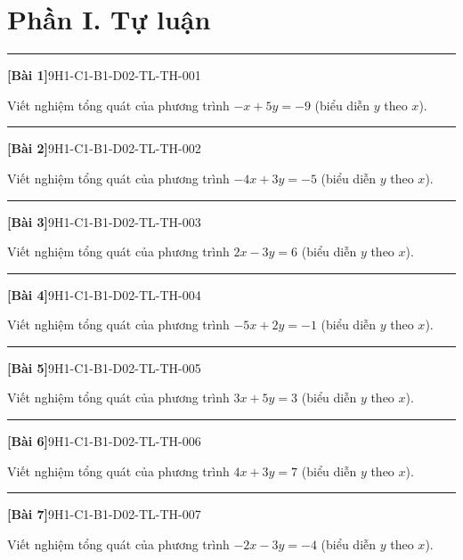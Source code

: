 \documentclass[12pt,a4paper]{article}
\newif\ifloigiai
\newenvironment{cauhoi}[2]{%
  \par\medskip\noindent\rule{\textwidth}{0.4pt}\par\nopagebreak
  \noindent\textbf{[#1]}\hfill{\scriptsize\ttfamily #2}\par\nopagebreak\smallskip}{\par}
\newcommand{\loigiai}[1]{\ifloigiai\par\smallskip\noindent\textit{Lời giải.} #1\par\fi}
\begin{document}
\section*{Phần I. Tự luận}
\begin{cauhoi}{Bài 1}{9H1-C1-B1-D02-TL-TH-001}
Viết nghiệm tổng quát của phương trình $-x+5y=-9$ (biểu diễn $y$ theo $x$).
\loigiai{Ta có $5y=-9+x$ nên $y=\dfrac{1}{5}x-\dfrac{9}{5}$. Nghiệm tổng quát là $(x;\,\dfrac{1}{5}x-\dfrac{9}{5})$ với $x\in\mathbb R$.}
\end{cauhoi}
\begin{cauhoi}{Bài 2}{9H1-C1-B1-D02-TL-TH-002}
Viết nghiệm tổng quát của phương trình $-4x+3y=-5$ (biểu diễn $y$ theo $x$).
\loigiai{Ta có $3y=-5+4x$ nên $y=\dfrac{4}{3}x-\dfrac{5}{3}$. Nghiệm tổng quát là $(x;\,\dfrac{4}{3}x-\dfrac{5}{3})$ với $x\in\mathbb R$.}
\end{cauhoi}
\begin{cauhoi}{Bài 3}{9H1-C1-B1-D02-TL-TH-003}
Viết nghiệm tổng quát của phương trình $2x-3y=6$ (biểu diễn $y$ theo $x$).
\loigiai{Ta có $-3y=6-2x$ nên $y=\dfrac{2}{3}x-2$. Nghiệm tổng quát là $(x;\,\dfrac{2}{3}x-2)$ với $x\in\mathbb R$.}
\end{cauhoi}
\begin{cauhoi}{Bài 4}{9H1-C1-B1-D02-TL-TH-004}
Viết nghiệm tổng quát của phương trình $-5x+2y=-1$ (biểu diễn $y$ theo $x$).
\loigiai{Ta có $2y=-1+5x$ nên $y=\dfrac{5}{2}x-\dfrac{1}{2}$. Nghiệm tổng quát là $(x;\,\dfrac{5}{2}x-\dfrac{1}{2})$ với $x\in\mathbb R$.}
\end{cauhoi}
\begin{cauhoi}{Bài 5}{9H1-C1-B1-D02-TL-TH-005}
Viết nghiệm tổng quát của phương trình $3x+5y=3$ (biểu diễn $y$ theo $x$).
\loigiai{Ta có $5y=3-3x$ nên $y=-\dfrac{3}{5}x+\dfrac{3}{5}$. Nghiệm tổng quát là $(x;\,-\dfrac{3}{5}x+\dfrac{3}{5})$ với $x\in\mathbb R$.}
\end{cauhoi}
\begin{cauhoi}{Bài 6}{9H1-C1-B1-D02-TL-TH-006}
Viết nghiệm tổng quát của phương trình $4x+3y=7$ (biểu diễn $y$ theo $x$).
\loigiai{Ta có $3y=7-4x$ nên $y=-\dfrac{4}{3}x+\dfrac{7}{3}$. Nghiệm tổng quát là $(x;\,-\dfrac{4}{3}x+\dfrac{7}{3})$ với $x\in\mathbb R$.}
\end{cauhoi}
\begin{cauhoi}{Bài 7}{9H1-C1-B1-D02-TL-TH-007}
Viết nghiệm tổng quát của phương trình $-2x-3y=-4$ (biểu diễn $y$ theo $x$).
\loigiai{Ta có $-3y=-4+2x$ nên $y=-\dfrac{2}{3}x+\dfrac{4}{3}$. Nghiệm tổng quát là $(x;\,-\dfrac{2}{3}x+\dfrac{4}{3})$ với $x\in\mathbb R$.}
\end{cauhoi}
\end{document}
